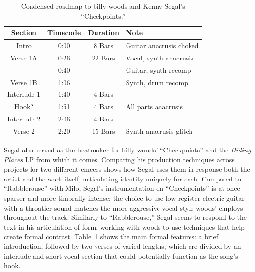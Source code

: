 \begin{table}[ht]
    \centering
    \begin{tabular}{|c|c|c|l|}
        \hline
         Section      & Timecode & Duration & Note                          \\ \hline
         Intro        & 0:00     & 8 Bars   & Guitar anacrusis choked       \\ \hline
         Verse 1A     & 0:26     & 22 Bars  & Vocal, synth  anacrusis       \\ \hline
                      & 0:40     &          & Guitar, synth recomp          \\ \hline
         Verse 1B     & 1:06     &          & Synth, drum recomp            \\ \hline
         Interlude 1  & 1:40     & 4 Bars   &                               \\ \hline
         Hook?        & 1:51     & 4 Bars   & All parts anacrusis           \\ \hline
         Interlude 2  & 2:06     & 4 Bars   &                               \\ \hline
         Verse 2      & 2:20     & 15 Bars  & Synth anacrusis glitch        \\ \hline
         
    \end{tabular}
    \caption{Condensed roadmap to billy woods and Kenny Segal's ``Checkpoints.''}
    \label{tab:checkpoints}
\end{table}

Segal also served as the beatmaker for billy woods' ``Checkpoints'' and the \textit{Hiding Places} LP 
from which it comes. Comparing his production techniques across projects for two different emcees shows 
how Segal uses them in response both the artist and the work itself, articulating identity uniquely for 
each. Compared to ``Rabblerouse'' with Milo, Segal's instrumentation on ``Checkpoints'' is at once sparser
and more timbrally intense; the choice to use low register electric guitar with a throatier sound matches 
the more aggressive vocal style woods' employs throughout the track. Similarly to ``Rabblerouse,'' Segal
seems to respond to the text in his articulation of form, working with woods to use techniques that help
create formal contrast. Table~\ref{tab:checkpoints} shows the main formal features: a brief introduction,
followed by two verses of varied lengths, which are divided by an interlude and short vocal section that
could potentially function as the song's hook.

